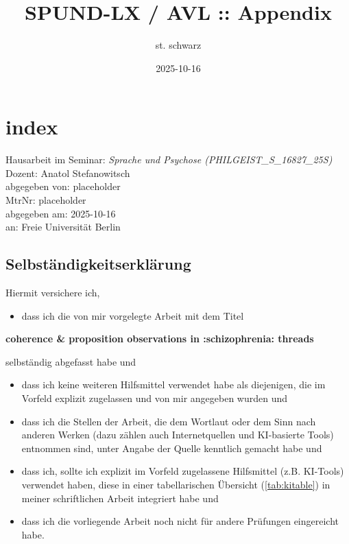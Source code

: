 \documentclass[
  12pt,
  oneside]{book}
\title{SPUND-LX / AVL :: Appendix}
\author{st. schwarz}
\date{2025-10-16}
\providecommand{\tightlist}{%
  \setlength{\itemsep}{0pt}\setlength{\parskip}{0pt}}
\begin{document}
\maketitle

{
\setcounter{tocdepth}{1}
\tableofcontents
}
\chapter{index}\label{index}

Hausarbeit im Seminar: \emph{Sprache und Psychose (PHILGEIST\_S\_16827\_25S)}\\
Dozent: Anatol Stefanowitsch\\
abgegeben von: placeholder\\
MtrNr: placeholder\\
abgegeben am: 2025-10-16\\
an: Freie Universität Berlin

\section{Selbständigkeitserklärung}\label{selbstuxe4ndigkeitserkluxe4rung}

Hiermit versichere ich,

\begin{itemize}
\tightlist
\item
  dass ich die von mir vorgelegte Arbeit mit dem Titel
\end{itemize}

\textbf{coherence \& proposition observations in :schizophrenia: threads}

selbständig abgefasst habe und

\begin{itemize}
\tightlist
\item
  dass ich keine weiteren Hilfsmittel verwendet habe als diejenigen, die im Vorfeld explizit zugelassen und von mir angegeben wurden und
\item
  dass ich die Stellen der Arbeit, die dem Wortlaut oder dem Sinn nach anderen Werken (dazu zählen auch Internetquellen und KI-basierte Tools) entnommen sind, unter Angabe der Quelle kenntlich gemacht habe und
\item
  dass ich, sollte ich explizit im Vorfeld zugelassene Hilfsmittel (z.B. KI-Tools) verwendet haben, diese in einer tabellarischen Übersicht (\ref{tab:kitable}) in meiner schriftlichen Arbeit integriert habe und
\item
  dass ich die vorliegende Arbeit noch nicht für andere Prüfungen eingereicht habe.
\end{itemize}
\end{document}
